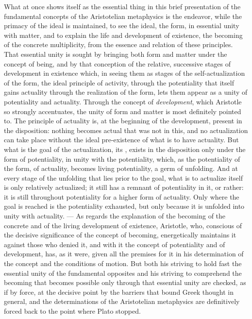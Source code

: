 \divrule

What at once shows itself as the essential thing in this brief
presentation of the fundamental concepts of the Aristotelian metaphysics
is the endeavor, while the primacy of the ideal is maintained, to see the
ideal, the form, in essential unity with matter, and to explain the life
and development of existence, the becoming of the concrete multiplicity,
from the essence and relation of these principles. That essential unity
is sought by bringing both form and matter under the concept of being,
and by that conception of the relative, successive stages of development
in existence which, in seeing them as stages of the
self-actualization of the form, the ideal principle of
activity, through the potentiality that itself gains actuality through
the realization of the form, lets them appear as a unity of potentiality
and actuality. Through the concept of \emph{development}, which Aristotle
so strongly accentuates, the unity of form and matter is most
definitely pointed to. The principle of actuality is, at the beginning of
the development, present in the disposition: nothing becomes actual that
was not in this, and no actualization can take place without the ideal
pre-existence of what is to have actuality. But what is the goal of the
actualization, its , exists in the disposition only under the
form of potentiality, in unity with the potentiality, which, as the
potentiality of the form, of actuality, becomes living potentiality, a
germ of unfolding. And at every stage of the unfolding that lies prior to
the goal, what is to actualize itself is only relatively actualized; it
still has a remnant of potentiality in it, or rather: it is still
throughout potentiality for a higher form of actuality. Only where the
goal is reached is the potentiality exhausted, but only because it is
unfolded into unity with actuality. --- As regards the explanation of the
becoming of the concrete and of the living development of existence,
Aristotle, who, conscious of the decisive significance of the concept of
becoming, energetically maintains it against those who denied it, and
with it the concept of potentiality and of development, has, as it were,
given all the premises for it in his determination of the concept and
the conditions of motion. But both his striving to hold fast the
essential unity of the fundamental opposites and his striving to
comprehend the becoming that becomes possible only through that
essential unity are checked, as if by force, at the decisive point by
the barriers that bound Greek thought in general, and the determinations
of the Aristotelian metaphysics are definitively forced back to the point
where Plato stopped.

